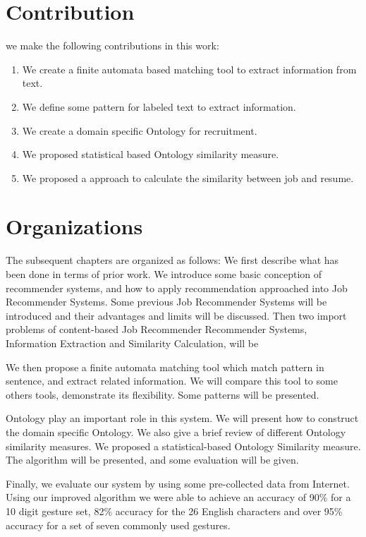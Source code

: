 \section{Contribution}

we make the following contributions in this work:

\begin{enumerate}
    \item  We create a finite automata based matching tool to extract information from text. 
    \item  We define some pattern for labeled text to extract information. 
    \item  We create a domain specific Ontology for recruitment.
    \item  We proposed statistical based Ontology similarity measure.  
    \item  We proposed a approach to calculate the similarity between job and resume.       
\end{enumerate}

\section{Organizations}
The subsequent chapters are organized as follows: We first describe what has been done in terms of prior work.  We introduce some basic conception of recommender systems, and how to apply recommendation approached into Job Recommender Systems. Some previous Job Recommender Systems will be introduced and their advantages and limits will be discussed. Then two import problems of content-based Job Recommender Recommender Systems, Information Extraction and Similarity Calculation, will be 

We then propose a finite automata matching tool which match pattern in sentence, and extract related information. We will compare this tool to some others tools, demonstrate its flexibility. Some patterns will be presented.
 
Ontology play an important role in this system. We will present how to construct the domain specific Ontology. We also give a brief review of different Ontology similarity measures. We proposed a statistical-based Ontology Similarity measure. The algorithm will be presented, and some evaluation will be given. 

Finally, we evaluate our system by using some pre-collected data from Internet. Using our improved algorithm we were able to achieve an accuracy of 90\% for a 10 digit gesture set, 82\% accuracy for the 26 English characters and over 95\% accuracy for a set of seven commonly used gestures.
